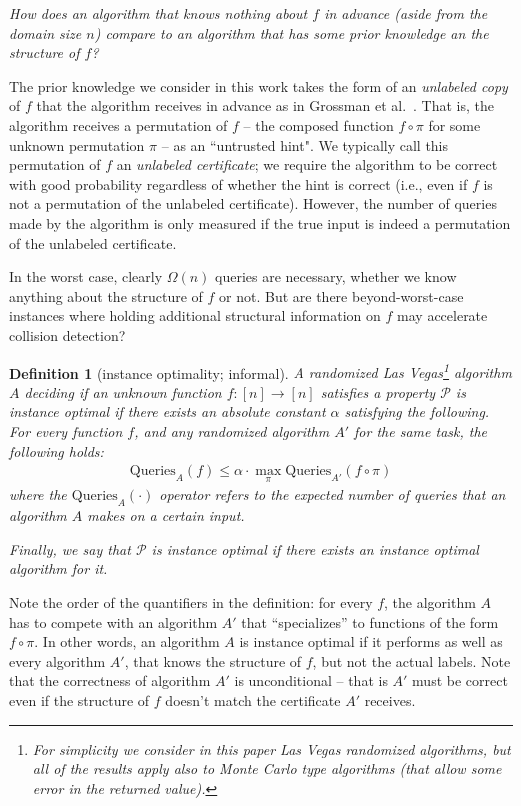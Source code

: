 \documentclass[11pt]{article}
\numberwithin{equation}{section}
\newtheorem{definition}[definition]{Definition}
\renewcommand{\P}{\mathcal{P}}
\newcommand{\1}{\mathbf{1}}
\begin{document}
\begin{center}
\textit{How does an algorithm that knows nothing about $f$ in advance (aside from the domain size $n$) compare to an algorithm that has some prior knowledge an the structure of $f$? 
}


\end{center}
The prior knowledge we consider in this work takes the form of an \emph{unlabeled copy} of $f$ that the algorithm receives in advance as in Grossman et al.~\cite{GrossmanKN20}. That is, the algorithm receives a permutation of $f$ -- the composed function $f \circ \pi$ for some unknown permutation $\pi$ -- as an ``untrusted hint". We typically call this permutation of $f$ an \emph{unlabeled certificate}; we require the algorithm to be correct with good probability regardless of whether the hint is correct (i.e., even if $f$ is not a permutation of the unlabeled certificate). However, the number of queries made by the algorithm is only measured if the true input is indeed a permutation of the unlabeled certificate.


In the worst case, clearly $\Omega(n)$ queries are necessary, whether we know anything about the structure of $f$ or not. But are there beyond-worst-case instances where holding additional structural information on $f$ may accelerate collision detection?

\begin{definition}[instance optimality; informal] \label{def:inst_opt_inf} A randomized Las Vegas\footnote{For simplicity we consider in this paper Las Vegas randomized algorithms, but all of the results apply also to Monte Carlo type algorithms (that allow some error in the returned value).}
algorithm $A$ deciding if an unknown function $f \colon [n] \to [n]$ satisfies a property $\P$ is \emph{instance optimal} if there exists an absolute constant $\alpha$ satisfying the following. For every function $f$, and any randomized algorithm $A'$ for the same task, the following holds:
\begin{align*}
\text{Queries}_A(f) \le \alpha \cdot \max_\pi \text{Queries}_{A'}(f \circ \pi)
\end{align*}
where the $\text{Queries}_A(\cdot)$ operator refers to the expected number of queries that an algorithm $A$ makes on a certain input.

Finally, we say that $\P$ is instance optimal if there exists an instance optimal algorithm for it.

\end{definition}
Note the order of the quantifiers in the definition: for every $f$, the algorithm $A$ has to compete with an algorithm $A'$ that ``specializes'' to functions of the form $f \circ \pi$. 
In other words, an algorithm $A$ is instance optimal if it performs as well as every algorithm $A'$, that knows the structure of $f$, but not the actual labels. Note that the correctness of algorithm $A'$ is unconditional -- that is $A'$ must be correct even if the structure of $f$ doesn't match the certificate $A'$ receives.
\end{document}
